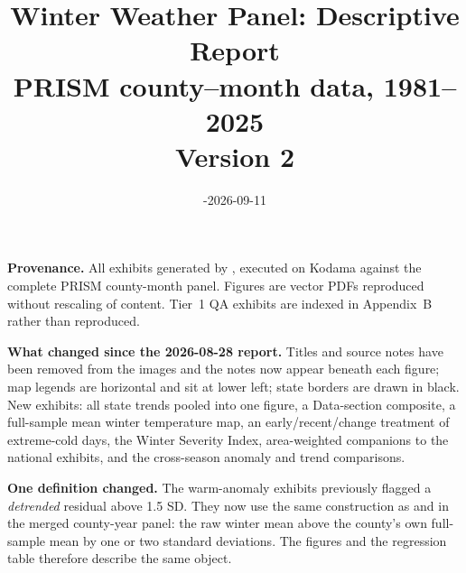 \documentclass[11pt, english, letterpaper]{article}
\begin{document}
\title{Winter Weather Panel: Descriptive Report\\[4pt]
\large PRISM county--month data, 1981--2025 \\[2pt]
\normalsize Version 2}
\date{-2026-09-11}
\maketitle
\thispagestyle{empty}
\vspace{-1em}
\begin{center}\begin{minipage}{0.86\textwidth}\small
\textbf{Provenance.} All exhibits generated by
, executed on Kodama against the
complete PRISM county-month panel. Figures are vector PDFs reproduced without
rescaling of content. Tier~1 QA exhibits are indexed in Appendix~B rather than
reproduced.
\par\vspace{6pt}
\textbf{What changed since the 2026-08-28 report.} Titles and source notes have been
removed from the images and the notes now appear beneath each figure; map legends are
horizontal and sit at lower left; state borders are drawn in black. New exhibits: all
state trends pooled into one figure, a Data-section composite, a full-sample mean
winter temperature map, an early/recent/change treatment of extreme-cold days, the
Winter Severity Index, area-weighted companions to the national exhibits, and the
cross-season anomaly and trend comparisons.
\par\vspace{6pt}
\textbf{One definition changed.} The warm-anomaly exhibits previously flagged a
\emph{detrended} residual above 1.5 SD. They now use the same construction as
 and  in the merged county-year panel:
the raw winter mean above the county's own full-sample mean by one or two standard
deviations. The figures and the regression table therefore describe the same object.
\end{minipage}\end{center}
\newpage
\tableofcontents
\newpage
\end{document}
